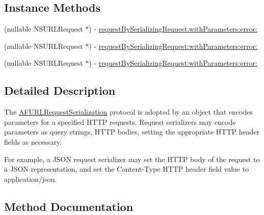 \subsection*{Instance Methods}
\begin{DoxyCompactItemize}
\item 
(nullable N\+S\+U\+R\+L\+Request $\ast$) -\/ \mbox{\hyperlink{protocol_a_f_u_r_l_request_serialization_01-p_a9a5ee0c078bd3bfc56b0a1c16151c923}{request\+By\+Serializing\+Request\+:with\+Parameters\+:error\+:}}
\item 
(nullable N\+S\+U\+R\+L\+Request $\ast$) -\/ \mbox{\hyperlink{protocol_a_f_u_r_l_request_serialization_01-p_a9a5ee0c078bd3bfc56b0a1c16151c923}{request\+By\+Serializing\+Request\+:with\+Parameters\+:error\+:}}
\item 
(nullable N\+S\+U\+R\+L\+Request $\ast$) -\/ \mbox{\hyperlink{protocol_a_f_u_r_l_request_serialization_01-p_a9a5ee0c078bd3bfc56b0a1c16151c923}{request\+By\+Serializing\+Request\+:with\+Parameters\+:error\+:}}
\end{DoxyCompactItemize}


\subsection{Detailed Description}
The {\ttfamily \mbox{\hyperlink{class_a_f_u_r_l_request_serialization-p}{A\+F\+U\+R\+L\+Request\+Serialization}}} protocol is adopted by an object that encodes parameters for a specified H\+T\+TP requests. Request serializers may encode parameters as query strings, H\+T\+TP bodies, setting the appropriate H\+T\+TP header fields as necessary.

For example, a J\+S\+ON request serializer may set the H\+T\+TP body of the request to a J\+S\+ON representation, and set the {\ttfamily Content-\/\+Type} H\+T\+TP header field value to {\ttfamily application/json}. 

\subsection{Method Documentation}
\mbox{\label{protocol_a_f_u_r_l_request_serialization_01-p_a9a5ee0c078bd3bfc56b0a1c16151c923}} 
